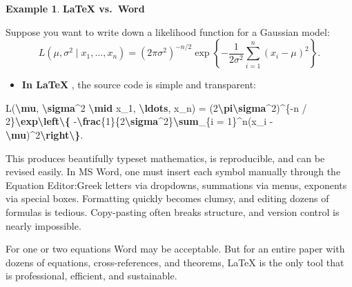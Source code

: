 \documentclass[
]{book}
\newenvironment{Shaded}{\begin{snugshade}}{\end{snugshade}}
\newcommand{\FunctionTok}[1]{\textcolor[rgb]{0.13,0.29,0.53}{\textbf{#1}}}
\newcommand{\NormalTok}[1]{#1}
\providecommand{\tightlist}{%
  \setlength{\itemsep}{0pt}\setlength{\parskip}{0pt}}
\theoremstyle{definition}
\theoremstyle{definition}
\newtheorem{example}{Example}[chapter]
\theoremstyle{definition}
\theoremstyle{definition}
\theoremstyle{remark}
\begin{document}
\begin{example}
\textbf{LaTeX vs.~Word}

Suppose you want to write down a likelihood function for a Gaussian model:
\[
L(\mu, \sigma^2 \mid x_1, \ldots, x_n)= (2\pi\sigma^2)^{-n / 2}\exp\left\{
-\frac{1}{2\sigma^2}\sum_{i = 1}^n(x_i - \mu)^2\right\}.
\]

\begin{itemize}
\tightlist
\item
  \textbf{In LaTeX} , the source code is simple and transparent:
\end{itemize}

\begin{Shaded}
\begin{Highlighting}[]
\NormalTok{L(}\FunctionTok{\textbackslash{}mu}\NormalTok{, }\FunctionTok{\textbackslash{}sigma}\NormalTok{\^{}2 }\FunctionTok{\textbackslash{}mid}\NormalTok{ x\_1, }\FunctionTok{\textbackslash{}ldots}\NormalTok{, x\_n) = (2}\FunctionTok{\textbackslash{}pi\textbackslash{}sigma}\NormalTok{\^{}2)\^{}\{{-}n / 2\}}\FunctionTok{\textbackslash{}exp\textbackslash{}left\textbackslash{}\{}
\NormalTok{{-}}\FunctionTok{\textbackslash{}frac}\NormalTok{\{1\}\{2}\FunctionTok{\textbackslash{}sigma}\NormalTok{\^{}2\}}\FunctionTok{\textbackslash{}sum}\NormalTok{\_\{i = 1\}\^{}n(x\_i {-} }\FunctionTok{\textbackslash{}mu}\NormalTok{)\^{}2}\FunctionTok{\textbackslash{}right\textbackslash{}\}}\NormalTok{.}
\end{Highlighting}
\end{Shaded}

This produces beautifully typeset mathematics, is reproducible, and can be revised easily.
In MS Word, one must insert each symbol manually through the Equation Editor:Greek letters via dropdowns, summations via menus, exponents via special boxes. Formatting quickly becomes clumsy, and editing dozens of formulas is tedious. Copy-pasting often breaks structure, and version control is nearly impossible.

For one or two equations Word may be acceptable. But for an entire paper with dozens of equations,
cross-references, and theorems, LaTeX is the only tool that is professional, efficient, and sustainable.
\end{example}
\end{document}
